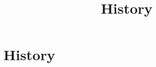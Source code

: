 \documentclass[../../OAE-SPEC-MAIN.tex]{subfiles}
\title{History}
\begin{document}
\chapter{History}\label{sec:history}









\end{document}
